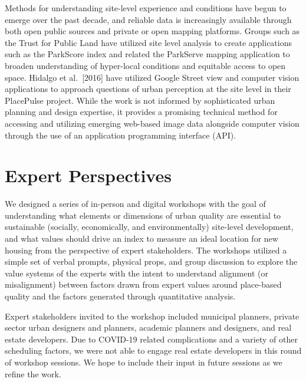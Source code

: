 \documentclass[
]{book}
\begin{document}
Methods for understanding site-level experience and conditions have begun to emerge over the past decade, and reliable data is increasingly available through both open public sources and private or open mapping platforms. Groups such as the Trust for Public Land have utilized site level analysis to create applications such as the ParkScore index and related the ParkServe mapping application to broaden understanding of hyper-local conditions and equitable access to open space. Hidalgo et al.~{[}2016{]} have utilized Google Street view and computer vision applications to approach questions of urban perception at the site level in their PlacePulse project. While the work is not informed by sophisticated urban planning and design expertise, it provides a promising technical method for accessing and utilizing emerging web-based image data alongside computer vision through the use of an application programming interface (API).

\hypertarget{expert-perspectives}{%
\chapter{Expert Perspectives}\label{expert-perspectives}}

We designed a series of in-person and digital workshops with the
goal of understanding what elements or dimensions of urban quality
are essential to sustainable (socially, economically, and
environmentally) site-level development, and what values should
drive an index to measure an ideal location for new housing from the
perspective of expert stakeholders. The workshops utilized a simple
set of verbal prompts, physical props, and group discussion to
explore the value systems of the experts with the intent to
understand alignment (or misalignment) between factors drawn from
expert values around place-based quality and the factors generated
through quantitative analysis.

Expert stakeholders invited to the workshop included municipal
planners, private sector urban designers and planners, academic
planners and designers, and real estate developers. Due to COVID-19
related complications and a variety of other scheduling factors, we
were not able to engage real estate developers in this round of
workshop sessions. We hope to include their input in future sessions
as we refine the work.
\end{document}
